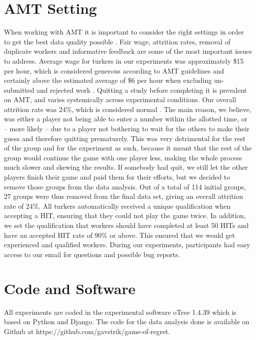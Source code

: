 \section{AMT Setting}
When working with AMT it is important to consider the right settings in order to get the best data quality possible \citep{ChandlerShapiro16}. Fair wage, attrition rates, removal of duplicate workers and informative feedback are some of the most important issues to address.
Average wage for turkers in our experiments was approximately \$15 per hour, which is considered generous according to AMT guidelines and certainly above the estimated average of \$6 per hour when excluding un-submitted and rejected work \citep{HaraEtAl18}.
Quitting a study before completing it is prevalent on AMT, and varies systemically across experimental conditions. Our overall attrition rate was 24\%, which is considered normal \citep{ZhouFishbach16}. The main reason, we believe, was either a player not being able to enter a number within the allotted time, or – more likely – due to a player not bothering to wait for the others to make their guess and therefore quitting prematurely. This was very detrimental for the rest of the group and for the experiment as such, because it meant that the rest of the group would continue the game with one player less, making the whole process much slower and skewing the results. If somebody had quit, we still let the other players finish their game and paid them for their efforts, but we decided to remove those groups from the data analysis. Out of a total of 114 initial groups, 27 groups were thus removed from the final data set, giving an overall attrition rate of 24\%.
All turkers automatically received a unique qualification when accepting a HIT, ensuring that they could not play the game twice. In addition, we set the qualification that workers should have completed at least 50 HITs and have an accepted HIT rate of 90\% or above. This ensured that we would get experienced and qualified workers. During our experiments, participants had easy access to our email for questions and possible bug reports. 

\section{Code and Software}
All experiments are coded in the experimental software oTree 1.4.39 \citep{ChenSchongerWickens16} which is based on Python and Django. The code for the data analysis done is available on Github at https://github.com/gavstrik/game-of-regret.

